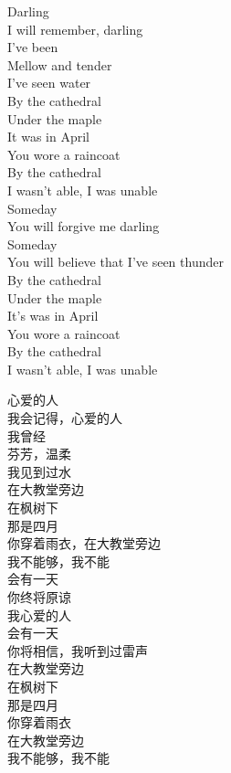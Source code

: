 		\vspace{1em}
		\begin{figure}[H]
		\begin{multicols}{2}
			\longpoem{}{}{} \centering
				Darling \\
				I will remember, darling \\
				I've been \\
				Mellow and tender \\
				I've seen water \\
				By the cathedral \\
				Under the maple \\
				It was in April \\
				You wore a raincoat \\
				By the cathedral \\
				I wasn't able, I was unable \\
				Someday \\
				You will forgive me darling \\
				Someday \\
				You will believe that I've seen thunder \\
				By the cathedral \\
				Under the maple \\
				It's was in April \\
				You wore a raincoat \\
				By the cathedral \\
				I wasn't able, I was unable \\
			\endlongpoem

			\longpoem{}{}{} \centering
				心爱的人 \\
				我会记得，心爱的人 \\
				我曾经 \\
				芬芳，温柔 \\
				我见到过水 \\
				在大教堂旁边 \\
				在枫树下 \\
				那是四月 \\
				你穿着雨衣，在大教堂旁边 \\
				我不能够，我不能 \\
				会有一天 \\
				你终将原谅 \\
				我心爱的人 \\
				会有一天 \\
				你将相信，我听到过雷声 \\
				在大教堂旁边 \\
				在枫树下 \\
				那是四月 \\
				你穿着雨衣 \\
				在大教堂旁边 \\
				我不能够，我不能 \\
			\endlongpoem
		\end{multicols}
		\end{figure}

